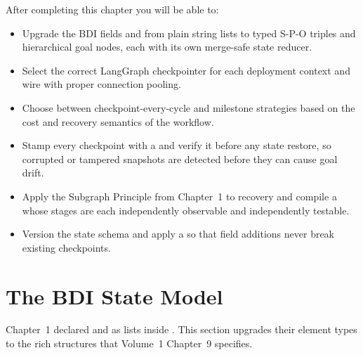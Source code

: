 


\begin{learningbox}
After completing this chapter you will be able to:
\begin{itemize}
  \item Upgrade the BDI fields  and  from
        plain string lists to typed S-P-O triples and hierarchical goal
        nodes, each with its own merge-safe state reducer.
  \item Select the correct LangGraph checkpointer for each deployment
        context and wire  with proper connection
        pooling.
  \item Choose between checkpoint-every-cycle and milestone strategies
        based on the cost and recovery semantics of the workflow.
  \item Stamp every checkpoint with a  and
        verify it before any state restore, so corrupted or tampered
        snapshots are detected before they can cause goal drift.
  \item Apply the Subgraph Principle from Chapter~1 to recovery and
        compile a  whose stages are
        each independently observable and independently testable.
  \item Version the state schema and apply a  so
        that field additions never break existing checkpoints.
\end{itemize}
\end{learningbox}

\section{The BDI State Model}
\label{sec:bdi-model}

Chapter~1 declared  and  as lists inside
.  This section upgrades their element types to the rich
structures that Volume~1 Chapter~9 specifies.

